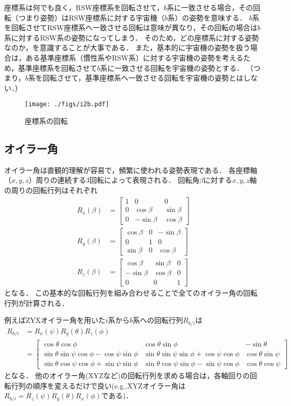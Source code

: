 \documentclass{article}
\begin{document}
座標系は何でも良く，RSW座標系を回転させて，$b$系に一致させる場合，その回転（つまり姿勢）はRSW座標系に対する宇宙機（$b$系）の姿勢を意味する．
$b$系を回転させてRSW座標系へ一致させる回転は意味が異なり，その回転の場合は$b$系に対するRSW系の姿勢になってしまう．
そのため，どの座標系に対する姿勢なのか，を意識することが大事である．
また，基本的に宇宙機の姿勢を扱う場合は，ある基準座標系（慣性系やRSW系）に対する宇宙機の姿勢を考えるため，基準座標系を回転させて$b$系に一致させる回転を宇宙機の姿勢とする．
（つまり，$b$系を回転させて，基準座標系へ一致させる回転を宇宙機の姿勢とはしない．）
\begin{figure}[tb]
\centering
\texttt{[image: ./figs/i2b.pdf]}
\caption{座標系の回転}
\label{fig:i2b}
\end{figure}

\subsection{オイラー角}
オイラー角は直観的理解が容易で，頻繁に使われる姿勢表現である．
各座標軸（$x,y,z$）周りの連続する3回転によって表現される．
回転角$\beta$に対する$x,y,z$軸の周りの回転行列はそれぞれ
\begin{align}
R_{x}(\beta)&=\begin{bmatrix}
1  &  0  &  0\\
 0  &  \cos\beta\   &  \sin\beta\\
 0  &  -\sin\beta\   &  \cos\beta
\end{bmatrix} \\
R_{y}(\beta) &= \begin{bmatrix}
\cos\beta & 0 & -\sin\beta\\
0 & 1 & 0\\
\sin\beta & 0 & \cos\beta
\end{bmatrix}\\
R_{z}(\beta)&=\begin{bmatrix}
\cos\beta & \sin\beta & 0\\
-\sin\beta & \cos\beta & 0\\
0 & 0 & 1
\end{bmatrix}
\end{align}
となる．
この基本的な回転行列を組み合わせることで全てのオイラー角の回転行列が計算される．

例えばZYXオイラー角を用いた$i$系から$b$系への回転行列$R_{b/i}$は
\begin{align}
R_{b/i} & =R_{x}(\psi)R_{y}(\theta)R_{z}(\phi)\\
&= \left[\begin{array}{ccc}
\cos\theta\cos\phi & \cos\theta\sin\phi & -\sin\theta\\
\sin\theta\sin\psi\cos\phi-\cos\psi\sin\phi & \sin\theta\sin\psi\sin\phi+\cos\psi\cos\phi & \cos\theta\sin\psi\\
\sin\theta\cos\psi\cos\phi+\sin\psi\sin\phi & \sin\theta\cos\psi\sin\phi-\sin\psi\cos\phi & \cos\theta\cos\psi
\end{array}\right]
\end{align}
となる．
他のオイラー角(XYZなど)の回転行列を求める場合は，各軸回りの回転行列の順序を変えるだけで良い(e.g.,XYZオイラー角は$R_{b/i}=R_{z}(\psi)R_{y}(\theta)R_{x}(\phi)$である)．
\end{document}
